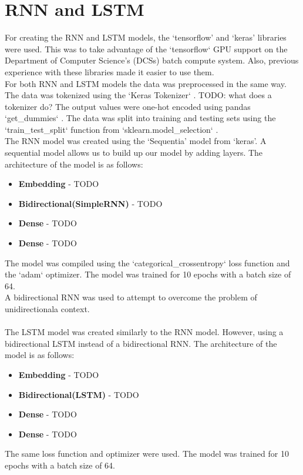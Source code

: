 \section{RNN and LSTM}
For creating the RNN and LSTM models, the `tensorflow' and `keras' libraries were used. This was to take advantage of the `tensorflow` GPU support on
the Department of Computer Science's (DCSs) batch compute system. Also, previous experience with these libraries made it easier to use them.\\
For both RNN and LSTM models the data was preprocessed in the same way. The data was tokenized using the `Keras Tokenizer` \cite{keras-tokenizer}. TODO:
what does a tokenizer do?
The output values were one-hot encoded using pandas `get\_dummies` \cite{pandas-dummies}. The data was split into training and testing sets using the `train\_test\_split`
function from `sklearn.model\_selection` \cite{sklearn-split}.\\
The RNN model was created using the `Sequentia' model from `keras'. A sequential model allows us to build up our model by adding layers. The architecture of the
model is as follows:
\begin{itemize}
    \item \textbf{Embedding} - TODO
    \item \textbf{Bidirectional(SimpleRNN)} - TODO
    \item \textbf{Dense} - TODO
    \item \textbf{Dense} - TODO
\end{itemize}
The model was compiled using the `categorical\_crossentropy` loss function and the `adam` optimizer. The model was trained for 10 epochs with a batch size of 64.\\
A bidirectional RNN was used to attempt to overcome the problem of unidirectionala context.\\\\
The LSTM model was created similarly to the RNN model. However, using a bidirectional LSTM instead of a bidirectional RNN. The architecture of the model is as follows:
\begin{itemize}
    \item \textbf{Embedding} - TODO
    \item \textbf{Bidirectional(LSTM)} - TODO
    \item \textbf{Dense} - TODO
    \item \textbf{Dense} - TODO
\end{itemize}
The same loss function and optimizer were used. The model was trained for 10 epochs with a batch size of 64.
